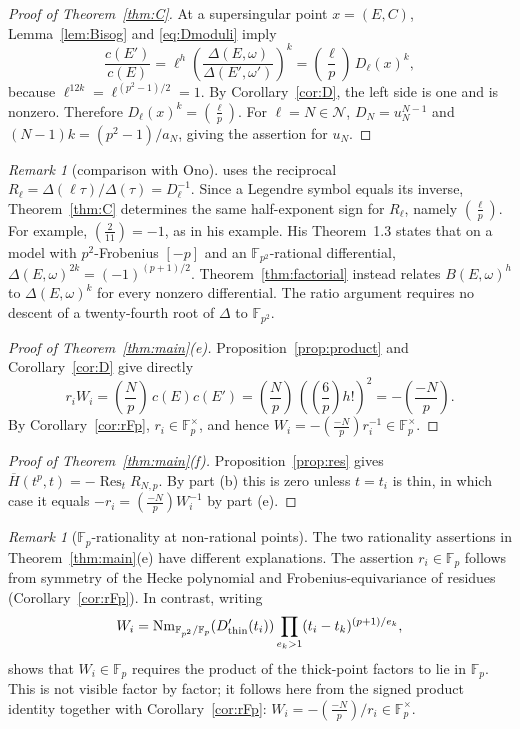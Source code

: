 \documentclass[11pt,a4paper]{article}
\numberwithin{equation}{section}
\theoremstyle{definition}
\theoremstyle{remark}
\newtheorem{remark}[theorem]{Remark}
\newcommand{\Fp}{\mathbb F_p}
\newcommand{\Fq}{\mathbb F_{p^2}}
\newcommand{\Res}{\operatorname{Res}}
\newcommand{\leg}[2]{\left(\frac{#1}{#2}\right)}
\newcommand{\Lp}[1]{\left(\frac{#1}{p}\right)}
\begin{document}
\begin{proof}[Proof of Theorem~\ref{thm:C}]
At a supersingular point $x=(E,C)$, Lemma~\ref{lem:Bisog} and
\eqref{eq:Dmoduli} imply
\[
\frac{c(E')}{c(E)}
=\ell^h\left(\frac{\Delta(E,\omega)}{\Delta(E',\omega')}\right)^k
=\Lp\ell\,D_\ell(x)^k,
\]
because $\ell^{12k}=\ell^{(p^2-1)/2}=1$.
By Corollary~\ref{cor:D}, the left side is one and is nonzero.
Therefore $D_\ell(x)^k=\Lp\ell$. For $\ell=N\in\mathcal N$,
$D_N=u_N^{N-1}$ and $(N-1)k=(p^2-1)/a_N$, giving the assertion for $u_N$.
\end{proof}

\begin{remark}[comparison with Ono]\label{rem:ono}
\citet[Theorem~1.2 and Remark~4]{Ono25} uses the reciprocal
$R_\ell=\Delta(\ell\tau)/\Delta(\tau)=D_\ell^{-1}$.
Since a Legendre symbol equals its inverse, Theorem~\ref{thm:C}
determines the same half-exponent sign for $R_\ell$, namely $\Lp\ell$.
For example, $\leg2{11}=-1$, as in his example.
His Theorem~1.3 states that on a model with $p^2$-Frobenius $[-p]$
and an $\Fq$-rational differential,
$\Delta(E,\omega)^{2k}=(-1)^{(p+1)/2}$.
Theorem~\ref{thm:factorial} instead relates $B(E,\omega)^h$ to
$\Delta(E,\omega)^k$ for every nonzero differential.
The ratio argument requires no descent of a twenty-fourth root of
$\Delta$ to $\Fq$.
\end{remark}

\begin{proof}[Proof of Theorem~\ref{thm:main}(e)]
Proposition~\ref{prop:product} and Corollary~\ref{cor:D} give directly
\[
r_iW_i=\Lp N\,c(E)c(E')
=\Lp N\,(\Lp6h!)^2=-\Lp{-N}.
\]
By Corollary~\ref{cor:rFp}, $r_i\in\Fp^\times$, and hence
$W_i=-\Lp{-N}r_i^{-1}\in\Fp^\times$.
\end{proof}

\begin{proof}[Proof of Theorem~\ref{thm:main}(f)]
Proposition~\ref{prop:res} gives
$\overline H(t^p,t)=-\Res_tR_{N,p}$. By part (b) this is zero
unless $t=t_i$ is thin, in which case it equals
$-r_i=\Lp{-N}W_i^{-1}$ by part (e).
\end{proof}

\begin{remark}[$\Fp$-rationality at non-rational points]
The two rationality assertions in Theorem~\ref{thm:main}(e) have different
explanations. The assertion $r_i\in\Fp$ follows from symmetry of the
Hecke polynomial and Frobenius-equivariance of residues
(Corollary~\ref{cor:rFp}). In contrast, writing
\[
W_i=\operatorname{Nm}_{\Fq/\Fp}(D_{\rm thin}'(t_i))
\prod_{e_k>1}(t_i-t_k)^{(p+1)/e_k},
\]
shows that $W_i\in\Fp$ requires the product of the thick-point factors
to lie in $\Fp$. This is not visible factor by factor; it follows here
from the signed product identity together with Corollary~\ref{cor:rFp}:
$W_i=-\Lp{-N}/r_i\in\Fp^\times$.
\end{remark}
\end{document}
